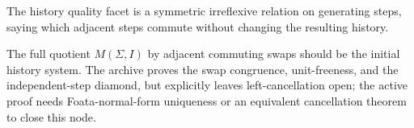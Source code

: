 \begin{proposition}\label{thm:history-commutation-relation}\leanok{}
The history quality facet is a symmetric irreflexive relation on generating
steps, saying which adjacent steps commute without changing the resulting
history.
\end{proposition}

\begin{theorem}\label{thm:history-quotient-universality}\notready{}
The full quotient \(M(\Sigma,I)\) by adjacent commuting swaps should be the
initial history system. The archive proves the swap congruence, unit-freeness,
and the independent-step diamond, but explicitly leaves left-cancellation open;
the active proof needs Foata-normal-form uniqueness or an equivalent
cancellation theorem to close this node.
\end{theorem}
